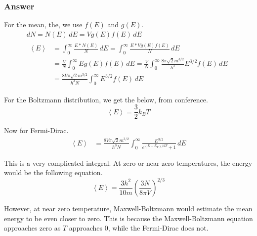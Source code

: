 \documentclass[12pt]{article}
\newcommand{\e}[1]{e^{#1}}
\begin{document}
        \subsubsection{Answer}
            For the mean, the, we use $f(E)$ and $g(E)$. 
            \begin{gather}
                dN = N(E)\,dE = V g(E) f(E)\,dE\\
                \begin{align}
                    \left\langle E \right\rangle    &=  \int_{0}^{\infty} \frac{E * N(E)}{N}\,dE
                        =   \int_{0}^{\infty} \frac{E * V g(E) f(E)}{N}\,dE\\
                        &=  \frac{V}{N} \int_{0}^{\infty} E g(E) f(E)\,dE
                        =   \frac{V}{N} \int_{0}^{\infty} \frac{8 \pi \sqrt{2} m^{3/2}}{h^3} E^{3/2} f(E)\,dE\\
                        &=  \frac{8 V \pi \sqrt{2} m^{3/2}}{h^3 N} \int_{0}^{\infty} E^{3/2} f(E)\,dE
                \end{align}
            \end{gather}

            For the Boltzmann distribution, we get the below, from conference.
            \begin{equation}
                \left\langle E \right\rangle = \frac{3}{2} k_B T
            \end{equation}

            Now for Fermi-Dirac.
            \begin{align}
                \left\langle E \right\rangle    &=  \frac{8 V \pi \sqrt{2} m^{3/2}}{h^3 N} \int_{0}^{\infty} \frac{E^{3/2}}{\e{(E-E_F)/kT} + 1} \,dE
            \end{align}
            
            This is a very complicated integral. 
            At zero or near zero temperatures, the energy would be the following equation.
            \begin{equation}
                \left\langle E \right\rangle = \frac{3 h^2}{10 m} \left( \frac{3N}{8\pi V} \right)^{2/3}
            \end{equation}

            However, at near zero temperature, Maxwell-Boltzmann would estimate the mean energy to be even closer to zero.
            This is because the Maxwell-Boltzmann equation approaches zero as $T$ approaches 0, while the Fermi-Dirac does not.
        
\end{document}

